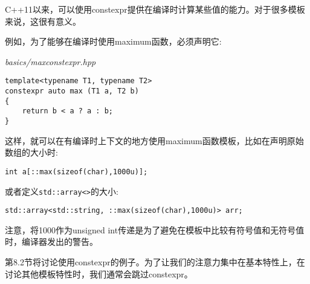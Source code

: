 
C++11以来，可以使用constexpr提供在编译时计算某些值的能力。对于很多模板来说，这很有意义。

例如，为了能够在编译时使用maximum函数，必须声明它:

\noindent
\textit{basics/maxconstexpr.hpp}
\begin{lstlisting}[style=styleCXX]
template<typename T1, typename T2>
constexpr auto max (T1 a, T2 b)
{
	return b < a ? a : b;
}
\end{lstlisting}

这样，就可以在有编译时上下文的地方使用maximum函数模板，比如在声明原始数组的大小时:

\begin{lstlisting}[style=styleCXX]
int a[::max(sizeof(char),1000u)];
\end{lstlisting}

或者定义\texttt{std::array<>}的大小:

\begin{lstlisting}[style=styleCXX]
std::array<std::string, ::max(sizeof(char),1000u)> arr;
\end{lstlisting}

注意，将1000作为unsigned int传递是为了避免在模板中比较有符号值和无符号值时，编译器发出的警告。

第8.2节将讨论使用constexpr的例子。为了让我们的注意力集中在基本特性上，在讨论其他模板特性时，我们通常会跳过constexpr。











